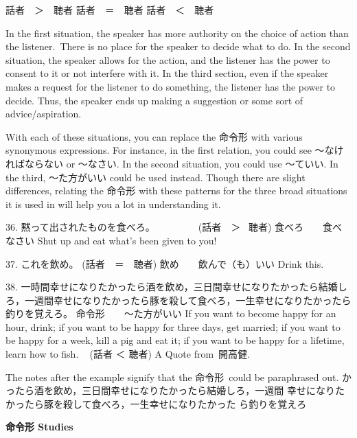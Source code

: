 \begin{center}
話者　＞　聴者  話者　＝　聴者  話者　＜　聴者 
\end{center}

\par{ In the first situation, the speaker has more authority on the choice of action than the listener. There is no place for the speaker to decide what to do. In the second situation, the speaker allows for the action, and the listener has the power to consent to it or not interfere with it. In the third section, even if the speaker makes a request for the listener to do something, the listener has the power to decide. Thus, the speaker ends up making a suggestion or some sort of advice\slash aspiration. }

\par{ With each of these situations, you can replace the 命令形 with various synonymous expressions. For instance, in the first relation, you could see ～なければならない or ～なさい. In the second situation, you could use ～ていい. In the third, ～た方がいい could be used instead. Though there are slight differences, relating the 命令形 with these patterns for the three broad situations it is used in will help you a lot in understanding it. }

\par{36. 黙って出されたものを食べろ。　　　　　(話者　＞  聴者) \hfill\break
食べろ　\textrightarrow 　食べなさい \hfill\break
Shut up and eat what's been given to you! }

\par{37. これを飲め。 (話者　＝　聴者) \hfill\break
飲め　\textrightarrow 　飲んで（も）いい \hfill\break
Drink this. }

\par{38. 一時間幸せになりたかったら酒を飲め，三日間幸せになりたかったら結婚しろ，一週間幸せになりたかったら豚を殺して食べろ，一生幸せになりたかったら釣りを覚えろ。 \hfill\break
命令形　\textrightarrow 　～た方がいい \hfill\break
If you want to become happy for an hour, drink; if you want to be happy for three days, get married; if you want to be happy for a week, kill a pig and eat it; if you want to be happy for a lifetime, learn how to fish.   (話者 ＜ 聴者) \hfill\break
A Quote from 開高健. }

\par{ The notes after the example signify that the 命令形 could be paraphrased out. }
かったら酒を飲め，三日間幸せになりたかったら結婚しろ，一週間 幸せになりたかったら豚を殺して食べろ，一生幸せになりたかった ら釣りを覚えろ 
\begin{center}
\textbf{命令形 Studies }
\end{center}


